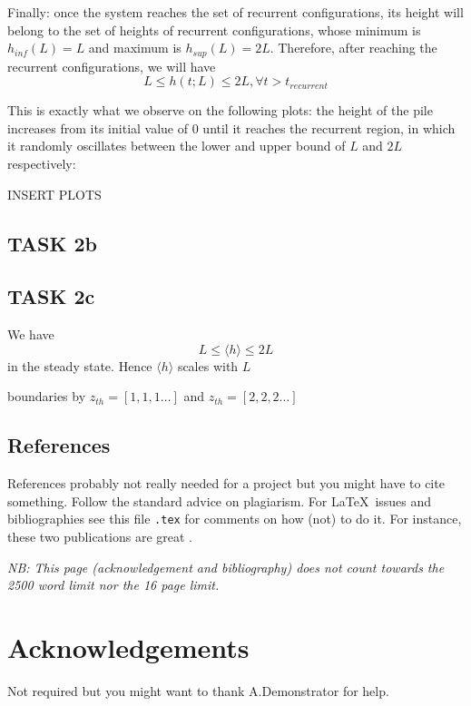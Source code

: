 \documentclass[a4paper,12pt]{article}
\begin{document}
Finally: once the system reaches the set of recurrent configurations, its height will belong to the set of heights of recurrent configurations, whose minimum is $h_{inf}(L)=L$ and maximum is $h_{sup}(L)=2L$. Therefore, after reaching the recurrent configurations, we will have
$$L\leq h(t; L) \leq 2L, \forall t > t_{recurrent}$$

This is exactly what we observe on the following plots: the height of the pile increases from its initial value of $0$ until it reaches the recurrent region, in which it randomly oscillates between the lower and upper bound of $L$ and $2L$ respectively:

INSERT PLOTS

\subsection{TASK 2b}
\subsection{TASK 2c}
We have
$$L \leq \langle h\rangle \leq 2L$$
in the steady state. Hence $\langle h\rangle$ scales with $L$

boundaries by $z_{th}=[1, 1, 1\dots]$ and $z_{th}=[2, 2, 2\dots]$



\subsection{References}

References probably not really needed for a project but you might have to cite something.  Follow the standard advice on plagiarism.  For \LaTeX\ issues and bibliographies see this file \texttt{{\jobname}.tex} for comments on how (not) to do it. For instance, these two publications are great \cite{KN05,EL09}.

\newpage
\noindent
\emph{NB: This page (acknowledgement and bibliography) does not count towards the 2500 word limit nor the 16 page limit.}
\vspace*{2cm}

\section*{Acknowledgements}

Not required but you might want to thank A.Demonstrator for help.
\end{document}
